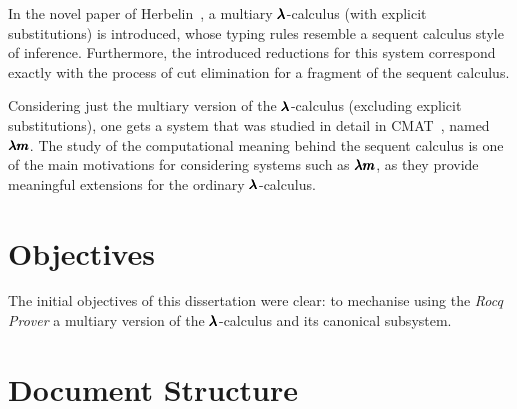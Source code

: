 In the novel paper of Herbelin~\cite{Herbelin1994}, a multiary $\pmb{\lambda}$-calculus (with explicit substitutions) is introduced, whose typing rules resemble a sequent calculus style of inference.
Furthermore, the introduced reductions for this system correspond exactly with the process of cut elimination for a fragment of the sequent calculus.

Considering just the multiary version of the $\pmb{\lambda}$-calculus (excluding explicit substitutions), one gets a system that was studied in detail in CMAT~\cite{JCESLuis}, named $\pmb{\lambda m}$.
The study of the computational meaning behind the sequent calculus is one of the main motivations for considering systems such as $\pmb{\lambda m}$, as they provide meaningful extensions for the ordinary $\pmb{\lambda}$-calculus.


\section{Objectives}
The initial objectives of this dissertation were clear: to mechanise using the \textit{Rocq Prover} a multiary version of the $\pmb{\lambda}$-calculus and its canonical subsystem.


\section{Document Structure}

